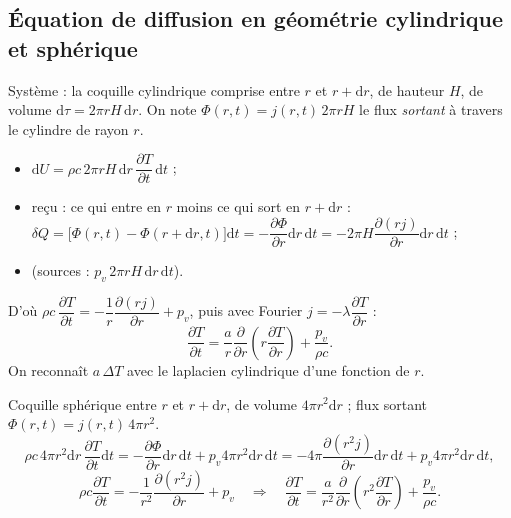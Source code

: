 \documentclass[11pt,a4paper]{article}
\newcommand{\dd}{\mathrm{d}}
\newcommand{\pd}[2]{\dfrac{\partial #1}{\partial #2}}
\begin{document}
\subsection{Équation de diffusion en géométrie cylindrique et sphérique}

\begin{demo}[title={Démonstration : géométrie cylindrique, $T=T(r,t)$}]
Système : la coquille cylindrique comprise entre $r$ et $r+\dd r$, de hauteur $H$, de volume
$\dd\tau=2\pi rH\,\dd r$. On note $\Phi(r,t)=j(r,t)\,2\pi rH$ le flux \emph{sortant} à
travers le cylindre de rayon $r$.

\begin{center}
\end{center}

\begin{itemize}[leftmargin=1.5em]
  \item $\dd U=\rho c\,2\pi rH\,\dd r\,\pd{T}{t}\,\dd t$ ;
  \item reçu : ce qui entre en $r$ moins ce qui sort en $r+\dd r$ :
        $\delta Q=\big[\Phi(r,t)-\Phi(r+\dd r,t)\big]\dd t=-\pd{\Phi}{r}\dd r\,\dd t
        =-2\pi H\pd{(rj)}{r}\dd r\,\dd t$ ;
  \item (sources : $p_v\,2\pi rH\,\dd r\,\dd t$).
\end{itemize}
D'où $\rho c\,\pd{T}{t}=-\dfrac1r\pd{(rj)}{r}+p_v$, puis avec Fourier $j=-\lambda\pd{T}{r}$ :
\[ \boxed{\pd{T}{t}=\dfrac{a}{r}\pd{}{r}\!\left(r\pd{T}{r}\right)+\dfrac{p_v}{\rho c}}. \]
On reconnaît $a\,\Delta T$ avec le laplacien cylindrique d'une fonction de $r$.
\end{demo}

\begin{demo}[title={Démonstration : géométrie sphérique, $T=T(r,t)$}]
Coquille sphérique entre $r$ et $r+\dd r$, de volume $4\pi r^2\dd r$ ; flux sortant
$\Phi(r,t)=j(r,t)\,4\pi r^2$.
\[ \rho c\,4\pi r^2\dd r\,\pd{T}{t}\dd t=-\pd{\Phi}{r}\dd r\,\dd t+p_v4\pi r^2\dd r\,\dd t
   =-4\pi\pd{(r^2j)}{r}\dd r\,\dd t+p_v4\pi r^2\dd r\,\dd t, \]
\[ \rho c\pd{T}{t}=-\dfrac{1}{r^2}\pd{(r^2j)}{r}+p_v
   \quad\Longrightarrow\quad
   \boxed{\pd{T}{t}=\dfrac{a}{r^2}\pd{}{r}\!\left(r^2\pd{T}{r}\right)+\dfrac{p_v}{\rho c}}. \]
\end{demo}
\end{document}
